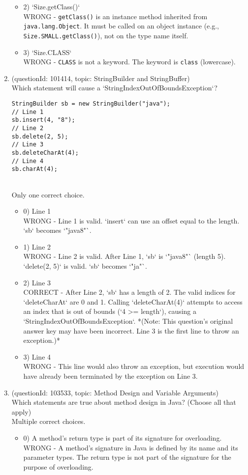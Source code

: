 \documentclass[12pt]{article}
\begin{document}
\begin{enumerate}[label=(\arabic*)]
\begin{itemize}
\item 2) `Size.getClass()`
 \\ 
WRONG - \verb|getClass()| is an instance method inherited from \verb|java.lang.Object|. It must be called on an object instance (e.g., \verb|Size.SMALL.getClass()|), not on the type name itself.

\item 3) `Size.CLASS`
 \\ 
WRONG - \verb|CLASS| is not a keyword. The keyword is \verb|class| (lowercase).

\end{itemize}
\item (questionId: 101414, topic: StringBuilder and StringBuffer) \\ 
Which statement will cause a `StringIndexOutOfBoundsException`?
\begin{verbatim}
StringBuilder sb = new StringBuilder("java");
// Line 1
sb.insert(4, "8");
// Line 2
sb.delete(2, 5);
// Line 3
sb.deleteCharAt(4);
// Line 4
sb.charAt(4);
\end{verbatim}
\\ \noindent Only one correct choice. 
\begin{itemize}
\item 0) Line 1
 \\ 
WRONG - Line 1 is valid. `insert` can use an offset equal to the length. `sb` becomes `"java8"`.

\item 1) Line 2
 \\ 
WRONG - Line 2 is valid. After Line 1, `sb` is `"java8"` (length 5). `delete(2, 5)` is valid. `sb` becomes `"ja"`.

\item 2) Line 3
 \\ 
CORRECT - After Line 2, `sb` has a length of 2. The valid indices for `deleteCharAt` are 0 and 1. Calling `deleteCharAt(4)` attempts to access an index that is out of bounds (`4 >= length`), causing a `StringIndexOutOfBoundsException`. *(Note: This question's original answer key may have been incorrect. Line 3 is the first line to throw an exception.)*

\item 3) Line 4
 \\ 
WRONG - This line would also throw an exception, but execution would have already been terminated by the exception on Line 3.

\end{itemize}
\item (questionId: 103533, topic: Method Design and Variable Arguments) \\ 
Which statements are true about method design in Java? (Choose all that apply)
\\ \noindent Multiple correct choices. 
\begin{itemize}
\item 0) A method's return type is part of its signature for overloading.
 \\ 
WRONG - A method's signature in Java is defined by its name and its parameter types. The return type is not part of the signature for the purpose of overloading.


\end{itemize}
\end{enumerate}
\end{document}
